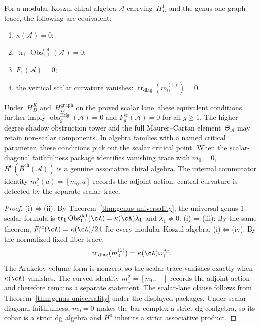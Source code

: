 \begin{corollary}\label{cor:critical-level-universality}
For a modular Koszul chiral algebra $\mathcal{A}$ carrying~$H_D^1$
and the genus-one graph trace, the following are equivalent:
\begin{enumerate}[label=\textup{(\roman*)}]
\item $\kappa(\mathcal{A}) = 0$;
\item $\operatorname{tr}_1\operatorname{Obs}^{\mathrm{def}}_{1,1}(\mathcal{A}) = 0$;
\item $F_1(\mathcal{A}) = 0$;
\item the vertical scalar curvature vanishes:
$\operatorname{tr}_{\mathrm{diag}}(m_0^{(1)})=0$.
\end{enumerate}
Under~$H_D^K$ and~$H_D^{\mathrm{graph}}$ on the proved scalar lane,
these equivalent conditions further imply
	$\operatorname{obs}^{\mathrm{Hdg}}_g(\mathcal{A}) = 0$ and
$F_g^{\mathrm{sc}}(\mathcal{A}) = 0$ for all $g \geq 1$.
The higher-degree shadow obstruction tower and the full
Maurer--Cartan element~$\Theta_\mathcal{A}$ may retain non-scalar
components. In algebra families with a named critical
parameter, these conditions pick out the scalar critical point. When
the scalar-diagonal faithfulness package identifies vanishing trace
with $m_0=0$, $H^0(\bar{B}^{\mathrm{ch}}(\mathcal{A}))$ is a genuine
associative chiral algebra. The internal commutator identity
$m_1^2(a)=[m_0,a]$ records the adjoint action; central curvature is
detected by the separate scalar trace.
\end{corollary}

\begin{proof}
(i)$\Leftrightarrow$(ii): By Theorem~\ref{thm:genus-universality},
the universal genus-$1$ scalar formula is
\(\operatorname{tr}_1\operatorname{Obs}^{\mathrm{def}}_{1,1}(\cA)=\kappa(\cA)\lambda_1\)
and
$\lambda_1 \neq 0$.
(i)$\Leftrightarrow$(iii): By the same theorem,
\(F_1^{\mathrm{sc}}(\cA)=\kappa(\cA)/24\)
for every modular Koszul algebra.
(i)$\Leftrightarrow$(iv): By the normalized fixed-fiber trace,
\[
 \operatorname{tr}_{\mathrm{diag}}(m_0^{(1)})
 =\kappa(\cA)\omega_1^{\mathrm{Ar}}.
\]
The Arakelov volume form is nonzero, so the scalar trace vanishes
exactly when~$\kappa(\cA)$ vanishes.  The curved identity
$m_1^2=[m_0,-]$ records the adjoint action and therefore remains a
separate statement.
The scalar-lane clause follows from Theorem~\ref{thm:genus-universality}
under the displayed packages. Under scalar-diagonal faithfulness,
$m_0=0$ makes the bar complex a strict dg coalgebra, so its cobar is
a strict dg algebra and $H^0$ inherits a strict associative product.
\end{proof}


